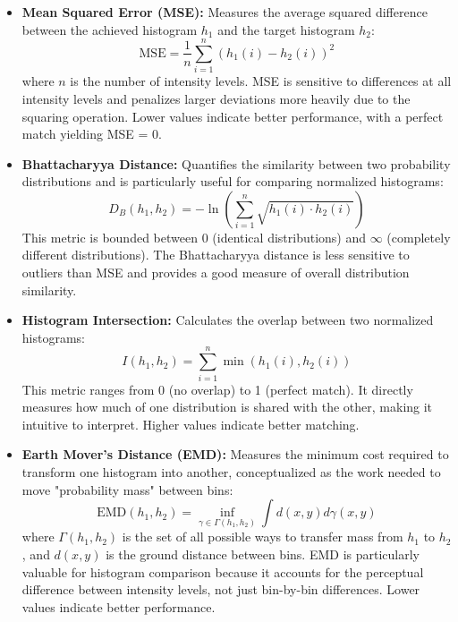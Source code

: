 \documentclass[12pt,a4paper]{article}
\begin{document}
\begin{itemize}
    \item \textbf{Mean Squared Error (MSE):} Measures the average squared difference between the achieved histogram $h_1$ and the target histogram $h_2$:
    \begin{equation}
        \text{MSE} = \frac{1}{n}\sum_{i=1}^{n}(h_1(i) - h_2(i))^2
    \end{equation}
    where $n$ is the number of intensity levels. MSE is sensitive to differences at all intensity levels and penalizes larger deviations more heavily due to the squaring operation. Lower values indicate better performance, with a perfect match yielding MSE = 0.
    \item \textbf{Bhattacharyya Distance:} Quantifies the similarity between two probability distributions and is particularly useful for comparing normalized histograms:
    \begin{equation}
        D_B(h_1, h_2) = -\ln\left(\sum_{i=1}^{n}\sqrt{h_1(i) \cdot h_2(i)}\right)
    \end{equation}
    This metric is bounded between 0 (identical distributions) and $\infty$ (completely different distributions). The Bhattacharyya distance is less sensitive to outliers than MSE and provides a good measure of overall distribution similarity.
    
    \item \textbf{Histogram Intersection:} Calculates the overlap between two normalized histograms:
    \begin{equation}
        I(h_1, h_2) = \sum_{i=1}^{n} \min(h_1(i), h_2(i))
    \end{equation}
    This metric ranges from 0 (no overlap) to 1 (perfect match). It directly measures how much of one distribution is shared with the other, making it intuitive to interpret. Higher values indicate better matching.
    
    \item \textbf{Earth Mover's Distance (EMD):} Measures the minimum cost required to transform one histogram into another, conceptualized as the work needed to move "probability mass" between bins:
    \begin{equation}
        \text{EMD}(h_1, h_2) = \inf_{\gamma \in \Gamma(h_1, h_2)} \int d(x, y) d\gamma(x, y)
    \end{equation}
    where $\Gamma(h_1, h_2)$ is the set of all possible ways to transfer mass from $h_1$ to $h_2$, and $d(x, y)$ is the ground distance between bins. EMD is particularly valuable for histogram comparison because it accounts for the perceptual difference between intensity levels, not just bin-by-bin differences. Lower values indicate better performance.
\end{itemize}
\end{document}
